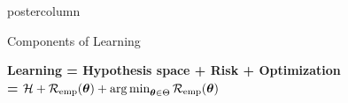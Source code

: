 \documentclass{beamer}
\begin{document}
\begin{frame}[fragile]{}
\begin{columns}
\begin{column}{.31\textwidth}
\begin{beamercolorbox}[center]{postercolumn}
\begin{minipage}{.98\textwidth}
{%
% 



\begin{myblock}{Components of Learning}

\textbf{Learning = Hypothesis space + Risk + Optimization} \\
 \textbf{= }$ \mathcal{H} + \mathcal{R}_{\text{emp}}(\bm{\theta}) + \operatorname{arg\,min}_{\bm{\theta} \in \Theta} 
\mathcal{R}_{\text{emp}}(\bm{\theta})$

% 
% 
% 
% 
% 
% 
% 
% 
% 


\end{myblock}
			  }
			\end{minipage}
		\end{beamercolorbox}
	\end{column}
\end{columns}

\end{frame}
\end{document}
